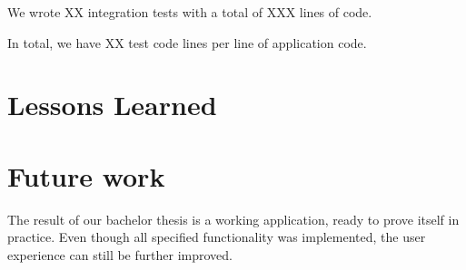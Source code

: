 We wrote XX integration tests with a total of XXX lines of code. %

In total, we have XX test code lines per line of application code.  %


\section{Lessons Learned}






\section{Future work}
The result of our bachelor thesis is a working application, ready to prove itself in practice.
Even though all specified functionality was implemented, the user experience can still be further improved.

